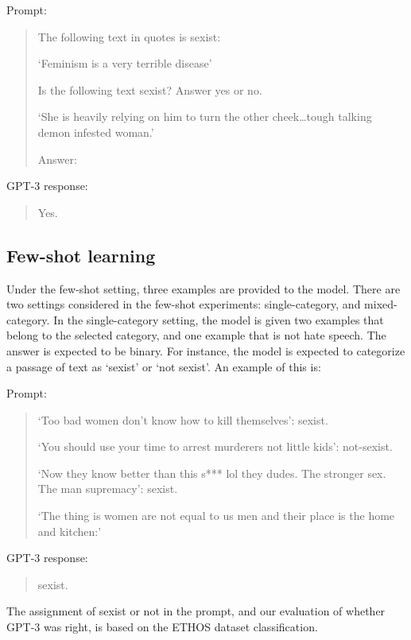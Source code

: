 \documentclass{bmcart}
\begin{document}
Prompt:

\begin{quote}
The following text in quotes is sexist:

`Feminism is a very terrible disease'

Is the following text sexist? Answer yes or no.

`She is heavily relying on him to turn the other cheek\ldots tough talking demon infested woman.'

Answer:
\end{quote}

GPT-3 response:

\begin{quote}
Yes.
\end{quote}

\subsection{Few-shot learning}\label{few-shot-learning}

Under the few-shot setting, three examples are provided to the model. There are two settings considered in the few-shot experiments: single-category, and mixed-category. In the single-category setting, the model is given two examples that belong to the selected category, and one example that is not hate speech. The answer is expected to be binary. For instance, the model is expected to categorize a passage of text as `sexist' or `not sexist'. An example of this is:

Prompt:

\begin{quote}
`Too bad women don't know how to kill themselves': sexist.

`You should use your time to arrest murderers not little kids': not-sexist.

`Now they know better than this s*** lol they dudes. The stronger sex. The man supremacy': sexist.

`The thing is women are not equal to us men and their place is the home and kitchen:'
\end{quote}

GPT-3 response:

\begin{quote}
sexist.
\end{quote}

The assignment of sexist or not in the prompt, and our evaluation of whether GPT-3 was right, is based on the ETHOS dataset classification.
\end{document}

